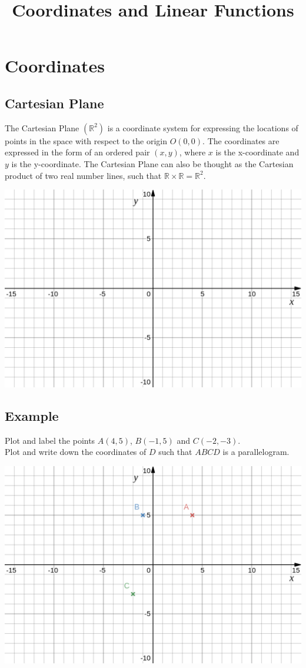\documentclass[a4paper,12pt]{article}
\title{Coordinates and Linear Functions}
\author{}
\date{}
\begin{document}
\maketitle

\section{Coordinates}
\subsection{Cartesian Plane}
The Cartesian Plane \(\left(\mathbb R^2\right)\) is a coordinate system for expressing the locations of points in the space with respect to the origin \(O(0,0)\).
The coordinates are expressed in the form of an ordered pair \((x,y)\),
where \(x\) is the x-coordinate and \(y\) is the y-coordinate.
The Cartesian Plane can also be thought as the Cartesian product of two real number lines,
such that \(\mathbb R\times\mathbb R=\mathbb R^2\).
\begin{center}
\includegraphics[width=.8\textwidth]{catesian.png}
\end{center}
\subsection{Example}
Plot and label the points \(A(4,5)\), \(B(-1,5)\) and \(C(-2,-3)\).\\
Plot and write down the coordinates of \(D\) such that \(ABCD\) is a parallelogram.
\begin{center}
\includegraphics[width=.99\textwidth]{ex1cat.png}
\end{center}
\end{document}
